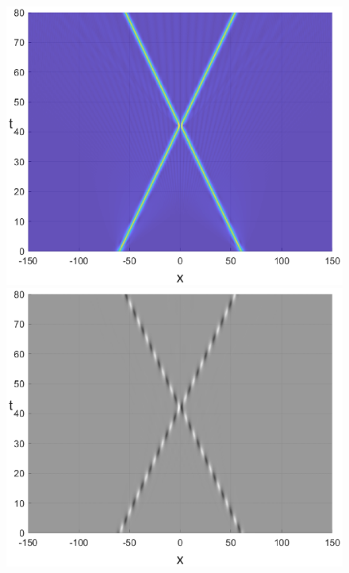 \documentclass[14pt,a4paper]{extreport}
\begin{document}
			\begin{figure}[H]
				\begin{minipage}[h]{0.32\linewidth}
					\includegraphics[width=1\linewidth]{fig52.eps}
				\end{minipage}
				\begin{minipage}[h]{0.32\linewidth}
					\includegraphics[width=1\linewidth]{fig55.eps}

\end{minipage}
\end{figure}
\end{document}
